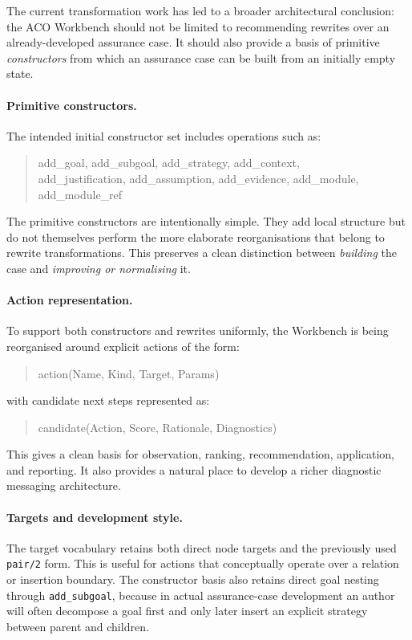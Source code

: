 \documentclass{article}
\begin{document}
The current transformation work has led to a broader architectural conclusion: the ACO Workbench should not be limited to recommending rewrites over an already-developed assurance case.
It should also provide a basis of primitive \emph{constructors} from which an assurance case can be built from an initially empty state.

\paragraph{Primitive constructors.}
The intended initial constructor set includes operations such as:
\begin{quote}\ttfamily
add\_goal, add\_subgoal, add\_strategy, add\_context,\\
add\_justification, add\_assumption, add\_evidence,
add\_module, add\_module\_ref
\end{quote}
The primitive constructors are intentionally simple.
They add local structure but do not themselves perform the more elaborate reorganisations that belong to rewrite transformations.
This preserves a clean distinction between \emph{building} the case and \emph{improving or normalising} it.

\paragraph{Action representation.}
To support both constructors and rewrites uniformly, the Workbench is being reorganised around explicit actions of the form:
\begin{quote}\ttfamily
action(Name, Kind, Target, Params)
\end{quote}
with candidate next steps represented as:
\begin{quote}\ttfamily
candidate(Action, Score, Rationale, Diagnostics)
\end{quote}
This gives a clean basis for observation, ranking, recommendation, application, and reporting.
It also provides a natural place to develop a richer diagnostic messaging architecture.

\paragraph{Targets and development style.}
The target vocabulary retains both direct node targets and the previously used \texttt{pair/2} form.
This is useful for actions that conceptually operate over a relation or insertion boundary.
The constructor basis also retains direct goal nesting through \texttt{add\_subgoal}, because in actual assurance-case development an author will often decompose a goal first and only later insert an explicit strategy between parent and children.
\end{document}
